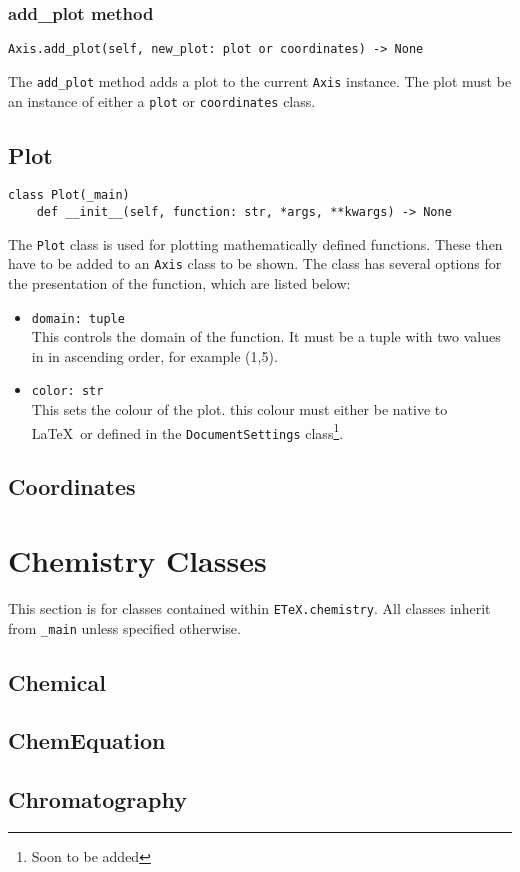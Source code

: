 \documentclass{article}
\begin{document}
\subsubsection{add\_plot method}\label{subsubsec:add_plot_method}
\begin{verbatim}
Axis.add_plot(self, new_plot: plot or coordinates) -> None
\end{verbatim}
The \verb|add_plot| method adds a plot to the current \verb|Axis| instance. The plot must be an instance of either a \verb|plot| or \verb|coordinates| class.
\subsection{Plot}\label{subsec:plot}
\begin{verbatim}
class Plot(_main)
	def __init__(self, function: str, *args, **kwargs) -> None
\end{verbatim}
The \verb|Plot| class is used for plotting mathematically defined functions. These then have to be added to an \verb|Axis| class to be shown. The class has several options for the presentation of the function, which are listed below:\begin{itemize}
\item \verb|domain: tuple|\\This controls the domain of the function. It must be a tuple with two values in in ascending order, for example (1,5).
\item \verb|color: str|\\This sets the colour of the plot. this colour must either be native to \LaTeX\ or defined in the \verb|DocumentSettings| class\footnote{Soon to be added}.
\end{itemize}

\subsection{Coordinates}\label{subsec:coordinates}

\section{Chemistry Classes}\label{sec:chemistry_classes}
This section is for classes contained within \verb|ETeX.chemistry|. All classes inherit from \verb|_main| unless specified otherwise.
\subsection{Chemical}\label{subsec:chemical}

\subsection{ChemEquation}\label{subsec:chemequation}

\subsection{Chromatography}\label{subsec:chromatography}
\end{document}
